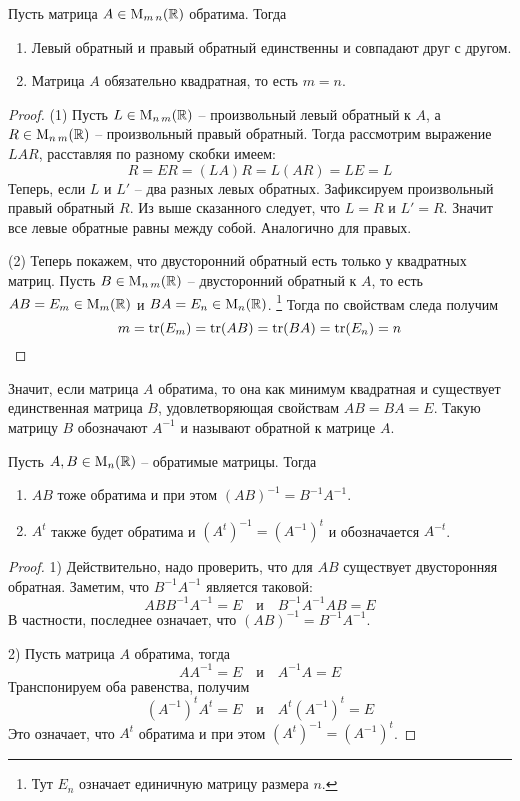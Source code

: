\begin{claim}
Пусть матрица $A\in\operatorname{M}_{m\,n}(\mathbb R)$ обратима.
Тогда
\begin{enumerate}
\item Левый обратный и правый обратный единственны и совпадают друг с другом.

\item Матрица $A$ обязательно квадратная, то есть $m = n$.
\end{enumerate}
\end{claim}
\begin{proof}
(1) Пусть $L\in\operatorname{M}_{n\,m}(\mathbb R)$ -- произвольный левый обратный к $A$, а $R\in\operatorname{M}_{n\,m}(\mathbb R)$ -- произвольный правый обратный.
Тогда рассмотрим выражение $LAR$, расставляя по разному скобки имеем:
\[
R = ER = (LA)R = L (AR) = LE = L
\]
Теперь, если $L$ и $L'$ -- два разных левых обратных.
Зафиксируем произвольный правый обратный $R$.
Из выше сказанного следует, что $L = R$ и $L' = R$.
Значит все левые обратные равны между собой.
Аналогично для правых.

(2) Теперь покажем, что двусторонний обратный есть только у квадратных матриц.
Пусть $B\in \operatorname{M}_{n\,m}(\mathbb R)$ -- двусторонний обратный к $A$, то есть $AB = E_m\in\operatorname{M}_{m}(\mathbb R)$ и $BA = E_n\in \operatorname{M}_{n}(\mathbb R)$.%
\footnote{Тут $E_n$ означает единичную матрицу размера $n$.}
Тогда по свойствам следа получим
\[
m = \operatorname{tr}(E_m) = \operatorname{tr}(AB) = \operatorname{tr}(BA) = \operatorname{tr}(E_n) = n
\]
\end{proof}

Значит, если матрица $A$ обратима, то она как минимум квадратная и существует единственная матрица $B$, удовлетворяющая свойствам $AB = BA = E$.
Такую матрицу $B$ обозначают $A^{-1}$ и называют обратной к матрице $A$.

\begin{claim}
Пусть $A, B\in \operatorname{M}_{n}(\mathbb R)$ -- обратимые матрицы.
Тогда 
\begin{enumerate}
\item $AB$ тоже обратима и при этом $(AB)^{-1} = B^{-1}A^{-1}$.

\item  $A^t$ также будет обратима и $(A^t)^{-1} = (A^{-1})^t$ и обозначается $A^{-t}$.
\end{enumerate}
\end{claim}
\begin{proof}
1) Действительно, надо проверить, что для $AB$ существует двусторонняя обратная.
Заметим, что $B^{-1}A^{-1}$ является таковой:
\[
AB B^{-1}A^{-1} = E \quad\text{и}\quad B^{-1}A^{-1} AB = E
\]
В частности, последнее означает, что $(AB)^{-1} = B^{-1}A^{-1}$.

2) Пусть матрица $A$ обратима, тогда
\[
A A^{-1} = E\quad \text{и}\quad A^{-1}A = E
\]
Транспонируем оба равенства, получим
\[
(A^{-1})^t A^t = E\quad \text{и}\quad A^t (A^{-1})^t = E
\]
Это означает, что $A^t$ обратима и при этом $(A^t)^{-1} = (A^{-1})^t$.
\end{proof}

